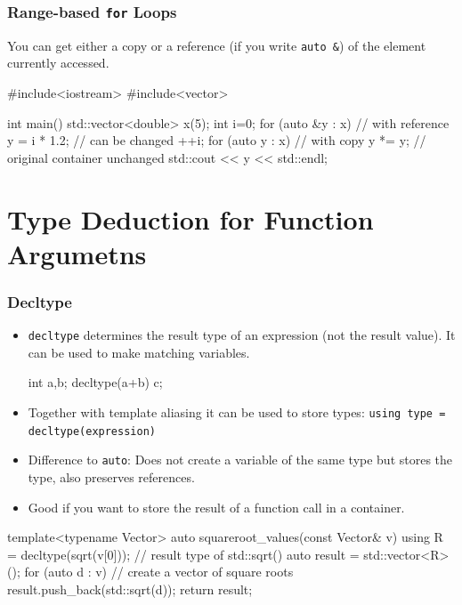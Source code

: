 \documentclass[aspectratio=169,ignorenonframetext,11pt]{beamer}
\def\inline{\lstinline[basicstyle=\small\ttfamily]}
\begin{document}
\begin{frame}[fragile]
  \frametitle<presentation>{Range-based \texttt{for} Loops}

  You can get either a copy or a reference (if you write \inline!auto &!) of the element currently accessed.

\begin{cppcode}
#include<iostream>
#include<vector>

int main()
{
  std::vector<double> x(5);
  int i=0;
  for (auto &y : x) {       // with reference
    y = i * 1.2;            // can be changed
    ++i;
  }
  for (auto y : x) {        // with copy
    y *= y;                 // original container unchanged
    std::cout << y << std::endl;
  }
}
\end{cppcode}

\end{frame}

\section{Type Deduction for Function Argumetns}

\begin{frame}[fragile]
  \frametitle{Decltype}
\begin{itemize}
\item \lstinline!decltype! determines the result type of an expression (not the result value). It can be used to make matching variables.
\small
  \begin{cppcode}
int a,b;
decltype(a+b) c;
\end{cppcode}
\item Together with template aliasing it can 
be used to store types:
\inline!using type = decltype(expression)! 
\item Difference to \inline!auto!: Does not create a variable of the same type but stores the type, also preserves references.
\item Good if you want to store the result of a function call in a container.
\end{itemize}
\small
\begin{cppcode}
template<typename Vector>
auto squareroot_values(const Vector& v)
{
  using R = decltype(sqrt(v[0])); // result type of std::sqrt()
  auto result = std::vector<R>();
  for (auto d : v)           // create a vector of square roots
    result.push_back(std::sqrt(d)); 
  return result;
}
\end{cppcode}
\end{frame}
\end{document}
